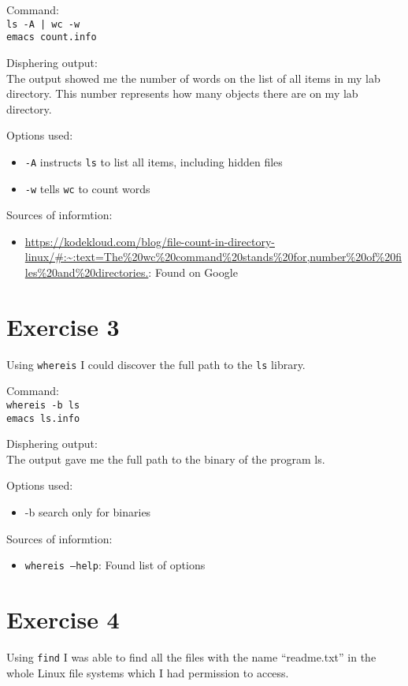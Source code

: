 \documentclass{article}
\begin{document}
Command:\\
\texttt{ls -A | wc -w}\\
\texttt{emacs count.info}

Disphering output:\\
The output showed me the number of words on the list of all items in my lab directory. This number represents how many objects there are on my lab directory.

Options used:
\begin{itemize}
    \item{\texttt{-A} instructs \texttt{ls} to list all items, including hidden files}
    \item{\texttt{-w} tells \texttt{wc} to count words}
\end{itemize}

Sources of informtion:
\begin{itemize}
    \item{\url{https://kodekloud.com/blog/file-count-in-directory-linux/#:~:text=The%20wc%20command%20stands%20for,number%20of%20files%20and%20directories.}: Found on Google}
\end{itemize}

\newpage
\section{Exercise 3}
Using \texttt{whereis} I could discover the full path to the \texttt{ls} library.

Command:\\
\texttt{whereis -b ls}\\
\texttt{emacs ls.info}

Disphering output:\\
The output gave me the full path to the binary of the program ls.

Options used:
\begin{itemize}
    \item{-b} search only for binaries
\end{itemize}

Sources of informtion:
\begin{itemize}
    \item{\texttt{whereis --help}: Found list of options}
\end{itemize}

\newpage
\section{Exercise 4}
Using \texttt{find} I was able to find all the files with the name ``readme.txt'' in the whole Linux file systems which I had permission to access.
\end{document}
